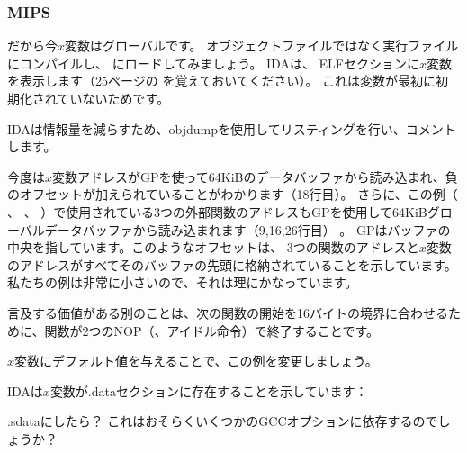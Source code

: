 \subsubsection{MIPS}


だから今$x$変数はグローバルです。 
オブジェクトファイルではなく実行ファイルにコンパイルし、 \IDA にロードしてみましょう。 
IDAは、 ELFセクションに$x$変数を表示します（25ページの を覚えておいてください）。
これは変数が最初に初期化されていないためです。



IDAは情報量を減らすため、objdumpを使用してリスティングを行い、コメントします。



今度は$x$変数アドレスがGPを使って64KiBのデータバッファから読み込まれ、負のオフセットが加えられていることがわかります（18行目）。 
さらに、この例（ \puts 、 \scanf 、 \printf ）で使用されている3つの外部関数のアドレスもGPを使用して64KiBグローバルデータバッファから読み込まれます（9,16,26行目） 。 
GPはバッファの中央を指しています。このようなオフセットは、
3つの関数のアドレスと$x$変数のアドレスがすべてそのバッファの先頭に格納されていることを示しています。 
私たちの例は非常に小さいので、それは理にかなっています。


言及する価値がある別のことは、次の関数の開始を16バイトの境界に合わせるために、関数が2つの\ac{NOP}（、アイドル命令）で終了することです。


$x$変数にデフォルト値を与えることで、この例を変更しましょう。



IDAは$x$変数が.dataセクションに存在することを示しています：



.sdataにしたら？ これはおそらくいくつかのGCCオプションに依存するのでしょうか？

